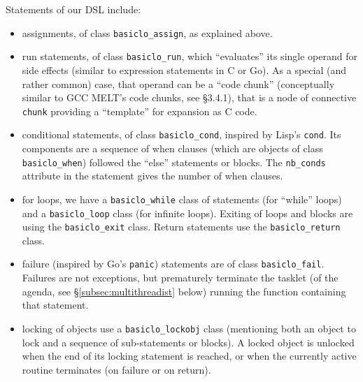 Statements of our DSL include:

\begin{itemize}
\item assignments, of class \texttt{basiclo\_assign}, as explained above.
  
  \item run statements, of class \texttt{basiclo\_run},  which ``evaluates'' its single operand
    for side effects (similar to expression statements in C or Go). As
    a special (and rather common) case, that operand can be a ``code
    chunk''  (conceptually similar to GCC MELT's
    code chunks, see \cite{Starynkevitch-DSL2011} \S3.4.1), that is a
    node of connective \texttt{chunk} providing a ``template'' for
    expansion as C code.

  \item conditional statements, of class \texttt{basiclo\_cond},
      inspired by Lisp's \texttt{cond}. Its components are a sequence
      of when clauses (which are objects of class
      \texttt{basiclo\_when}) followed the ``else'' statements or
      blocks. The \texttt{nb\_conds} attribute in the statement gives
      the number of when clauses.

    \item for loops, we have a \texttt{basiclo\_while} class of
      statements (for ``while'' loops) and a \texttt{basiclo\_loop}
      class (for infinite loops). Exiting of loops and blocks are
      using the \texttt{basiclo\_exit} class. Return statements use
      the \texttt{basiclo\_return} class.

      \item failure (inspired by Go's \texttt{panic}) statements are
        of class \texttt{basiclo\_fail}. Failures are not exceptions,
        but prematurely terminate the tasklet (of the agenda, see
        \S\ref{subsec:multithreadist} below) running the function
        containing that statement.

      \item locking of objects use a \texttt{basiclo\_lockobj} class
        (mentioning both an object to lock and a sequence of
        sub-statements or blocks). A locked object is unlocked when
        the end of its locking statement is reached, or when the
        currently active routine terminates (on failure or on return).


\end{itemize}
